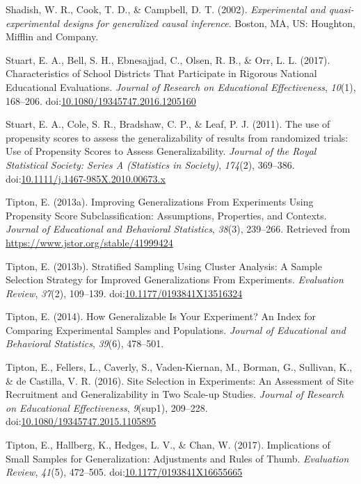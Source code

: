\documentclass[man,floatsintext]{apa6}
\begin{document}
\leavevmode\hypertarget{ref-shadishExperimentalQuasiexperimentalDesigns2002}{}%
Shadish, W. R., Cook, T. D., \& Campbell, D. T. (2002). \emph{Experimental and quasi-experimental designs for generalized causal inference}. Boston, MA, US: Houghton, Mifflin and Company.

\leavevmode\hypertarget{ref-stuartCharacteristicsSchoolDistricts2017}{}%
Stuart, E. A., Bell, S. H., Ebnesajjad, C., Olsen, R. B., \& Orr, L. L. (2017). Characteristics of School Districts That Participate in Rigorous National Educational Evaluations. \emph{Journal of Research on Educational Effectiveness}, \emph{10}(1), 168--206. doi:\href{https://doi.org/10.1080/19345747.2016.1205160}{10.1080/19345747.2016.1205160}

\leavevmode\hypertarget{ref-stuartUsePropensityScores2011}{}%
Stuart, E. A., Cole, S. R., Bradshaw, C. P., \& Leaf, P. J. (2011). The use of propensity scores to assess the generalizability of results from randomized trials: Use of Propensity Scores to Assess Generalizability. \emph{Journal of the Royal Statistical Society: Series A (Statistics in Society)}, \emph{174}(2), 369--386. doi:\href{https://doi.org/10.1111/j.1467-985X.2010.00673.x}{10.1111/j.1467-985X.2010.00673.x}

\leavevmode\hypertarget{ref-tiptonImprovingGeneralizationsExperiments2013}{}%
Tipton, E. (2013a). Improving Generalizations From Experiments Using Propensity Score Subclassification: Assumptions, Properties, and Contexts. \emph{Journal of Educational and Behavioral Statistics}, \emph{38}(3), 239--266. Retrieved from \url{https://www.jstor.org/stable/41999424}

\leavevmode\hypertarget{ref-tiptonStratifiedSamplingUsing2013}{}%
Tipton, E. (2013b). Stratified Sampling Using Cluster Analysis: A Sample Selection Strategy for Improved Generalizations From Experiments. \emph{Evaluation Review}, \emph{37}(2), 109--139. doi:\href{https://doi.org/10.1177/0193841X13516324}{10.1177/0193841X13516324}

\leavevmode\hypertarget{ref-tiptonHowGeneralizableYour2014}{}%
Tipton, E. (2014). How Generalizable Is Your Experiment? An Index for Comparing Experimental Samples and Populations. \emph{Journal of Educational and Behavioral Statistics}, \emph{39}(6), 478--501.

\leavevmode\hypertarget{ref-tiptonSiteSelectionExperiments2016}{}%
Tipton, E., Fellers, L., Caverly, S., Vaden-Kiernan, M., Borman, G., Sullivan, K., \& de Castilla, V. R. (2016). Site Selection in Experiments: An Assessment of Site Recruitment and Generalizability in Two Scale-up Studies. \emph{Journal of Research on Educational Effectiveness}, \emph{9}(sup1), 209--228. doi:\href{https://doi.org/10.1080/19345747.2015.1105895}{10.1080/19345747.2015.1105895}

\leavevmode\hypertarget{ref-tiptonImplicationsSmallSamples2017}{}%
Tipton, E., Hallberg, K., Hedges, L. V., \& Chan, W. (2017). Implications of Small Samples for Generalization: Adjustments and Rules of Thumb. \emph{Evaluation Review}, \emph{41}(5), 472--505. doi:\href{https://doi.org/10.1177/0193841X16655665}{10.1177/0193841X16655665}

\endgroup
\end{document}
